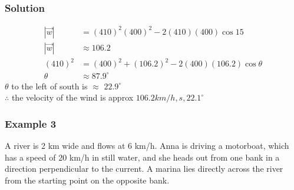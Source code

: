 \documentclass{article}
\begin{document}
\begin{multicols}{2}

\columnbreak

\subsubsection*{Solution}
\begin{align*}
    |\vec{w}|&=(410)^2(400)^2-2(410)(400)\cos 15\\
    |\vec{w}|&\approx 106.2\\
    (410)^2&=(400)^2+(106.2)^2-2(400)(106.2)\cos \theta\\
    \theta &\approx 87.9^{\circ}
\end{align*}
$\theta$ to the left of south is $\approx$ $22.9^{\circ}$\\
$\therefore$ the velocity of the wind is approx $106.2 km/h, s, 22.1^{\circ}$


\end{multicols}

\subsubsection*{Example 3}
A river is 2 km wide and flows at 6 km/h. Anna is driving a motorboat, which has a speed of 20 km/h in still water, and she heads out from one bank in a direction perpendicular to the current. A marina lies directly across the river from the starting point on the opposite bank.
\end{document}

